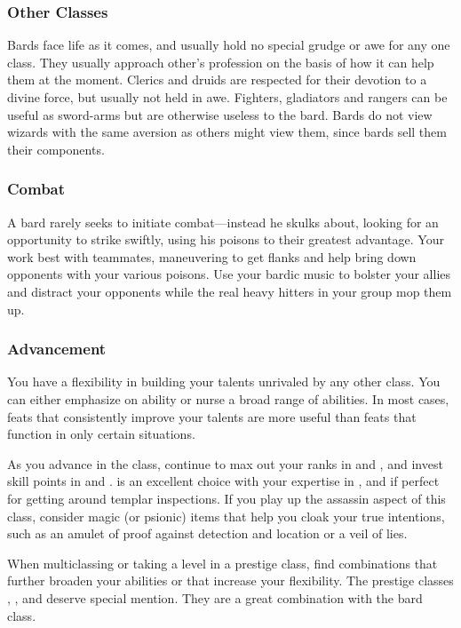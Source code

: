 \subsubsection{Other Classes}
Bards face life as it comes, and usually hold no special grudge or awe for any one class. They usually approach other's profession on the basis of how it can help them at the moment. Clerics and druids are respected for their devotion to a divine force, but usually not held in awe. Fighters, gladiators and rangers can be useful as sword-arms but are otherwise useless to the bard. Bards do not view wizards with the same aversion as others might view them, since bards sell them their components.

\subsubsection{Combat}
A bard rarely seeks to initiate combat---instead he skulks about, looking for an opportunity to strike swiftly, using his poisons to their greatest advantage. Your work best with teammates, maneuvering to get flanks and help bring down opponents with your various poisons. Use your bardic music to bolster your allies and distract your opponents while the real heavy hitters in your group mop them up.

\subsubsection{Advancement}
You have a flexibility in building your talents unrivaled by any other class. You can either emphasize on ability or nurse a broad range of abilities. In most cases, feats that consistently improve your talents are more useful than feats that function in only certain situations.

As you advance in the class, continue to max out your ranks in  and , and invest skill points in  and .  is an excellent choice with your expertise in , and  if perfect for getting around templar inspections. If you play up the assassin aspect of this class, consider magic (or psionic) items that help you cloak your true intentions, such as an amulet of proof against detection and location or a veil of lies.

When multiclassing or taking a level in a prestige class, find combinations that further broaden your abilities or that increase your flexibility. The prestige classes , , and  deserve special mention. They are a great combination with the bard class.


